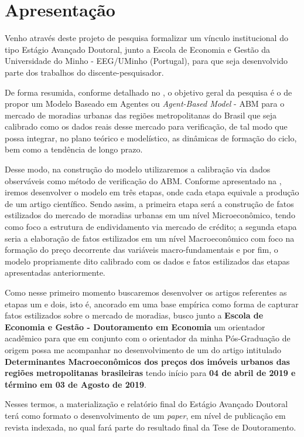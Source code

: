 \section{Apresentação}



Venho através deste projeto de pesquisa formalizar um vínculo institucional do tipo Estágio Avançado Doutoral, junto a Escola de Economia e Gestão da Universidade do Minho - EEG/UMinho (Portugal), para que seja desenvolvido parte dos trabalhos do discente-pesquisador.


De forma resumida, conforme detalhado no , o objetivo geral da pesquisa é o de propor um Modelo Baseado em Agentes ou \textit{Agent-Based Model} - ABM para o mercado de moradias urbanas das regiões metropolitanas do Brasil que seja calibrado como os dados reais desse mercado para verificação, de tal modo que possa integrar, no plano teórico e modelístico, as dinâmicas de formação do ciclo, bem como a tendência de longo prazo.

Desse modo, na construção do modelo utilizaremos a calibração via dados observáveis como método de verificação do ABM. Conforme apresentado na , iremos desenvolver o modelo em três etapas, onde cada etapa equivale a produção de um artigo científico. Sendo assim, a primeira etapa será a construção de fatos estilizados do mercado de moradias urbanas em um nível Microeconômico, tendo como foco a estrutura de endividamento via mercado de crédito; a segunda etapa seria a elaboração de fatos estilizados em um nível Macroeconômico com foco na formação do preço decorrente das variáveis macro-fundamentais e por fim, o modelo propriamente dito calibrado com os dados e fatos estilizados das etapas apresentadas anteriormente.

Como nesse primeiro momento buscaremos desenvolver os artigos referentes as etapas um e dois, isto é, ancorado em uma base empírica como forma de capturar fatos estilizados sobre o mercado de moradias, busco junto a \textbf{Escola de Economia e Gestão - Doutoramento em Economia} um orientador acadêmico para que em conjunto com o orientador da minha Pós-Graduação de origem possa me acompanhar no desenvolvimento de um do artigo intitulado \textbf{Determinantes Macroeconômicos dos preços dos imóveis urbanos das regiões metropolitanas brasileiras} tendo início para\textbf{ 04 de abril de 2019 e término em 03 de Agosto de 2019}.

Nesses termos, a materialização e relatório final do Estágio Avançado Doutoral terá como formato o desenvolvimento de um \textit{paper}, em nível de publicação em revista indexada, no qual fará parte do resultado final da Tese de Doutoramento.